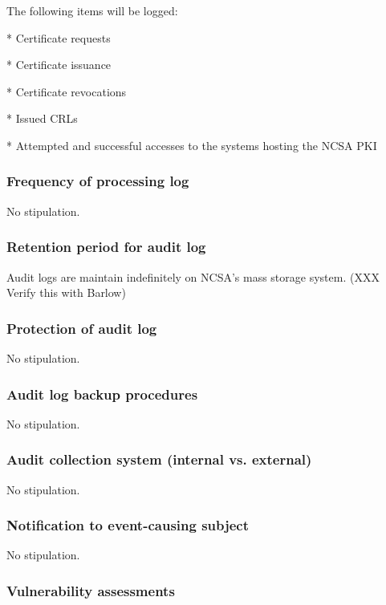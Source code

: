 \documentclass[10pt]{article}
\begin{document}
The following items will be logged:

* Certificate requests

* Certificate issuance

* Certificate revocations

* Issued CRLs

* Attempted and successful accesses to the systems hosting the NCSA
PKI

\subsubsection{Frequency of processing log}

No stipulation.

\subsubsection{Retention period for audit log}

Audit logs are maintain indefinitely on NCSA's mass storage system.
(XXX Verify this with Barlow)

\subsubsection{Protection of audit log}

No stipulation.

\subsubsection{Audit log backup procedures}

No stipulation.

\subsubsection{Audit collection system (internal vs. external)}

No stipulation.

\subsubsection{Notification to event-causing subject}

No stipulation.

\subsubsection{Vulnerability assessments}
\end{document}
